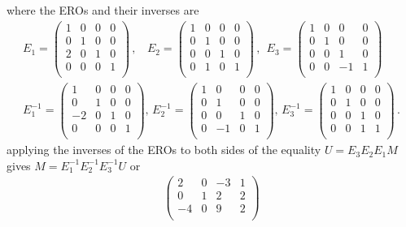 \begin{example}
where the EROs and their inverses are 
\begin{eqnarray*}
E_1=
\begin{pmatrix}
1&0&0&0\\
0&1&0&0\\
2&0&1&0\\
0&0&0&1\\
\end{pmatrix} \, ,~~~~
E_2=
\begin{pmatrix}
1&0&0&0\\
0&1&0&0\\
0&0&1&0\\
0&1&0&1\\
\end{pmatrix} \, ,~~
E_3=
\begin{pmatrix}
1&0&0&0\\
0&1&0&0\\
0&0&1&0\\
0&0&-1&1\\
\end{pmatrix} \, 
\\ %
E_1^{-1}=
\begin{pmatrix}
1&0&0&0\\
0&1&0&0\\
-2&0&1&0\\
0&0&0&1\\
\end{pmatrix}  , \,
E_2^{-1}=
\begin{pmatrix}
1&0&0&0\\
0&1&0&0\\
0&0&1&0\\
0&-1&0&1\\
\end{pmatrix}  , \,
E_3^{-1}=
\begin{pmatrix}
1&0&0&0\\
0&1&0&0\\
0&0&1&0\\
0&0&1&1\\
\end{pmatrix} \, .
\end{eqnarray*}
applying the inverses of the EROs to both sides of the equality  $U=E_3E_2E_1M$ gives 
$M=E_1^{-1}E_2^{-1}E_3^{-1}U$ or 
\begin{eqnarray*}
\!\!\! %
\begin{pmatrix}
2&0&-3&1\\
0&1&2&2\\
-4&0&9&2\\

\end{pmatrix}
\end{eqnarray*}
\end{example}
